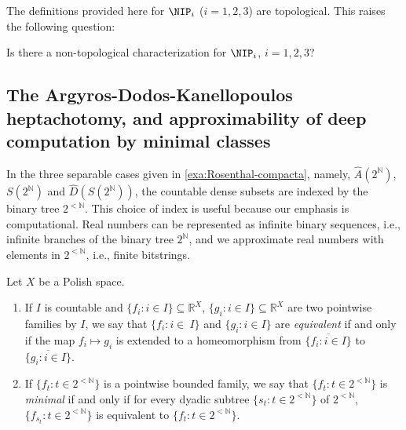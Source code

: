 The definitions provided here for $\NIP_i$ ($i=1,2,3$) are topological.
This raises the following question:

\begin{question}
    Is there a non-topological characterization for $\NIP_i$, $i=1,2,3$?
\end{question}

\subsection{The Argyros-Dodos-Kanellopoulos heptachotomy, and approximability of deep computation by minimal classes}\label{sec:heptachotomy}

In the three separable cases given in \ref{exa:Rosenthal-compacta}, namely, $\hat{A}(2^\mathbb{N})$, $S(2^\mathbb{N})$ and $\hat{D}(S(2^\mathbb{N}))$, the countable dense subsets are indexed by the binary tree $2^{<\mathbb{N}}$.
This choice of index is useful because our emphasis is computational.
Real numbers can be represented as infinite binary sequences, i.e., infinite branches of the binary tree $2^{\mathbb{N}}$, and
we approximate real numbers with elements in $2^{<\mathbb{N}}$, i.e., finite bitstrings.

\begin{definition}
    Let $X$ be a Polish space.

    \begin{enumerate}
        \item If $I$ is countable and $\{f_i:i\in I\}\subseteq\mathbb{R}^X$, $\{g_i:i\in I\}\subseteq\mathbb{R}^X$ are two pointwise families by $I$, we say that $\{f_i:i\in\ I\}$ and $\{g_i:i\in I\}$ are \emph{equivalent} if and only if the map $f_i\mapsto g_i$ is extended to a homeomorphism from $\overline{\{f_i:i\in I\}}$ to $\overline{\{g_i:i\in I\}}$.
        \item If $\{f_t:t\in 2^{<\mathbb{N}}\}$ is a pointwise bounded family, we say that $\{f_t:t\in 2^{<\mathbb{N}}\}$ is \emph{minimal} if and only if for every dyadic subtree $\{s_t:t\in 2^{<\mathbb{N}}\}$ of $2^{<\mathbb{N}}$, $\{f_{s_t}:t\in 2^{<\mathbb{N}}\}$ is equivalent to $\{f_t:t\in 2^{<\mathbb{N}}\}$.
    \end{enumerate}
\end{definition}

